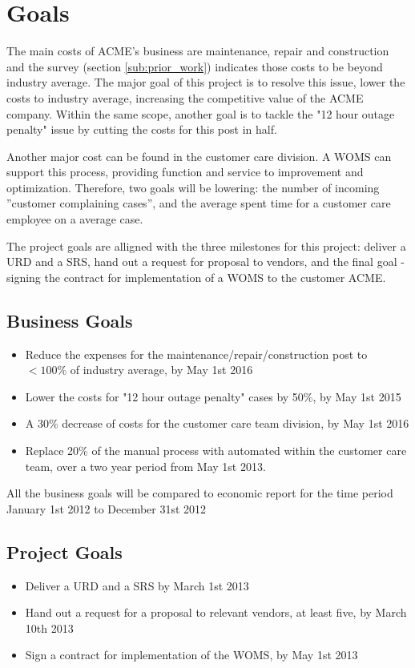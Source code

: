 \documentclass[a4paper]{article}
\begin{document}
\section{Goals} 
\label{sec:goals}
The main costs of ACME's business are maintenance, repair and construction and the survey (section \ref{sub:prior_work}) indicates those costs to be beyond industry average. The major goal of this project is to resolve this issue, lower the costs to industry average, increasing the competitive value of the ACME company. Within the same scope, another goal is to tackle the "12 hour outage penalty" issue by cutting the costs for this post in half. 

Another major cost can be found in the customer care division. A WOMS can support this process, providing function and service to improvement and optimization. Therefore, two goals will be lowering: the number of incoming ''customer complaining cases'', and the average spent time for a customer care employee on a average case.

The project goals are alligned with the three milestones for this project: deliver a URD and a SRS, hand out a request for proposal to vendors, and the final goal - signing the contract for implementation of a WOMS to the customer ACME.
\subsection{Business Goals}
\begin{itemize}
\item Reduce the expenses for the maintenance/repair/construction post to \\$<100\%$ of industry average, by May 1st 2016
\item Lower the costs for "12 hour outage penalty" cases by 50\%, by May 1st 2015
\item A 30\% decrease of costs for the customer care team division, by May 1st 2016
\item Replace 20\% of the manual process with automated within the customer care team, over a two year period from May 1st 2013.
\end{itemize}
All the business goals will be compared to economic report for the time period January 1st 2012 to December 31st 2012
\subsection{Project Goals}
\begin{itemize}
\item Deliver a URD and a SRS by March 1st 2013
\item Hand out a request for a proposal to relevant vendors, at least five, by March 10th 2013
\item Sign a contract for implementation of the WOMS, by May 1st 2013
\end{itemize}
\end{document}
